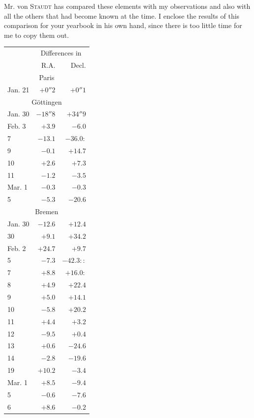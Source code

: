 Mr. von \textsc{Staudt} has compared these elements with my observations and also with all the others that had become known at the time. I enclose the results of this comparison for your yearbook in his own hand, since there is too little time for me to copy them out.

\begin{center}
\begin{tabular}{l|r|r}
& \multicolumn{2}{c}{Differences in} \\
& R.A. & Decl. \\
\multicolumn{3}{c}{Paris} \\
Jan. 21 & $+0''2$ & $+0''1$ \\
\multicolumn{3}{c}{Göttingen} \\
Jan. 30 & $-18''8$ & $+34''9$ \\
Feb. 3 & $+3.9$ & $-6.0$ \\
7 & $-13.1$ & $-36.0\!:$ \\
9 & $-0.1$ & $+14.7$ \\
10 & $+2.6$ & $+7.3$ \\
11 & $-1.2$ & $-3.5$ \\
Mar. 1 & $-0.3$ & $-0.3$ \\
5 & $-5.3$ & $-20.6$ \\
\multicolumn{3}{c}{Bremen} \\
Jan. 30 & $-12.6$ & $+12.4$ \\
30 & $+9.1$ & $+34.2$ \\
Feb. 2 & $+24.7$ & $+9.7$ \\
5 & $-7.3$ & $-42.3\!::$ \\
7 & $+8.8$ & $+16.0\!:$ \\
8 & $+4.9$ & $+22.4$ \\
9 & $+5.0$ & $+14.1$ \\
10 & $-5.8$ & $+20.2$ \\
11 & $+4.4$ & $+3.2$ \\
12 & $-9.5$ & $+0.4$ \\
13 & $+0.6$ & $-24.6$ \\
14 & $-2.8$ & $-19.6$ \\
19 & $+10.2$ & $-3.4$ \\
Mar. 1 & $+8.5$ & $-9.4$ \\
5 & $-0.6$ & $-7.6$ \\
6 & $+8.6$ & $-0.2$ \\
\end{tabular}
\end{center}

